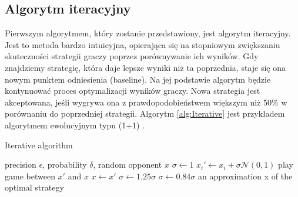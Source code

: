 \documentclass[inzynierska]{pwr_wmat_praca_dyplomowa}
\theoremstyle{plain}
\numberwithin{theorem}{chapter}
\theoremstyle{definition}
\numberwithin{theorem}{chapter}
\begin{document}
	\subsection{Algorytm iteracyjny}
		Pierwszym algorytmem, który zostanie przedstawiony, jest algorytm iteracyjny. Jest to metoda bardzo intuicyjna, opierająca się na stopniowym zwiększaniu skuteczności strategii graczy poprzez porównywanie ich wyników. Gdy znajdziemy strategię, która daje lepsze wyniki niż ta poprzednia, staje się ona nowym punktem odniesienia (baseline). Na jej podstawie algorytm będzie kontynuować proces optymalizacji wyników graczy. Nowa strategia jest akceptowana, jeśli wygrywa ona z prawdopodobieństwem większym niż 50\% w porównaniu do poprzedniej strategii. Algorytm \ref{alg:Iterative} jest przykładem algorytmem ewolucyjnym typu (1+1) \cite{droste1998rigorous}.
		\begin{algorithm}\captionsetup{labelformat=custom2}
			\caption{Iterative algorithm}\label{alg:Iterative}
			\begin{algorithmic}
				\Ensure  precision $\epsilon$, probability $\delta$, random opponent $x$
				\State $\sigma \gets 1 $ 
				\State $x_i' \gets x_i + \sigma \mathcal{N}(0,1)$ 
				\EndFor
				\Repeat
				\State play game between $x'$ and $x$
				\State $x \gets x'$
				\State $\sigma \gets 1.25\sigma$
				\Else
				\State $\sigma \gets 0.84 \sigma$
				\EndIf
				\EndWhile
				\State \Return an approximation x of the optimal strategy
			\end{algorithmic}
		\end{algorithm}
\end{document}
